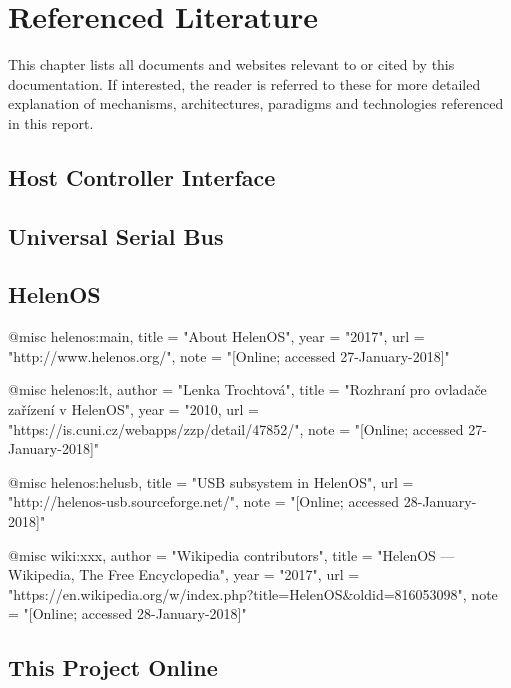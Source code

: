 \chapter{Referenced Literature}

This chapter lists all documents and websites relevant to or cited by this
documentation. If interested, the reader is referred to these for more detailed
explanation of mechanisms, architectures, paradigms and technologies referenced
in this report.


\section{Host Controller Interface}



\section{Universal Serial Bus}


\section{HelenOS}

@misc{ helenos:main,
    title = "About HelenOS",
    year = "2017",
    url = "http://www.helenos.org/",
    note = "[Online; accessed 27-January-2018]"
  }

@misc{ helenos:lt,
    author = "Lenka Trochtová",
    title = "Rozhraní pro ovladače zařízení v HelenOS",
    year = "2010,
    url = "https://is.cuni.cz/webapps/zzp/detail/47852/",
    note = "[Online; accessed 27-January-2018]"
  }

@misc{ helenos:helusb,
    title = "USB subsystem in HelenOS",
    url = "http://helenos-usb.sourceforge.net/",
    note = "[Online; accessed 28-January-2018]"
  }

@misc{ wiki:xxx,
    author = "Wikipedia contributors",
    title = "HelenOS --- Wikipedia{,} The Free Encyclopedia",
    year = "2017",
    url = "https://en.wikipedia.org/w/index.php?title=HelenOS\&oldid=816053098",
    note = "[Online; accessed 28-January-2018]"
  }

\section{This Project Online}

